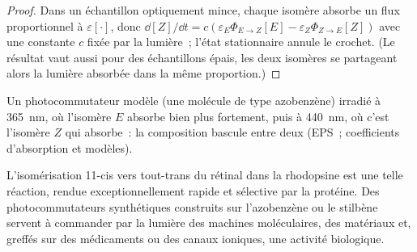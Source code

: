 \begin{proof}
Dans un échantillon optiquement mince, chaque isomère absorbe un flux
proportionnel à $\varepsilon[\cdot]$, donc
$\dd[Z]/\dd t = c(\varepsilon_E\Phi_{E\to Z}[E] - \varepsilon_Z\Phi_{Z\to E}[Z])$
avec une constante $c$ fixée par la lumière~;
l'état stationnaire annule le crochet. (Le résultat vaut aussi pour des
échantillons épais, les deux isomères se partageant alors la lumière
absorbée dans la même proportion.)
\end{proof}

\begin{omfigure}

{\small Un photocommutateur modèle (une molécule de type azobenzène)
irradié à \qty{365}{nm}, où l'isomère $E$ absorbe bien plus fortement,
puis à \qty{440}{nm}, où c'est l'isomère $Z$ qui absorbe~: la
composition bascule entre deux  (EPS~;
coefficients d'absorption et  modèles).}
\end{omfigure}

L'isomérisation 11-cis vers tout-trans du rétinal dans la rhodopsine est
une telle réaction, rendue exceptionnellement rapide et sélective par la
protéine. Des photocommutateurs synthétiques construits sur l'azobenzène
ou le stilbène servent à commander par la lumière des machines
moléculaires, des matériaux et, greffés sur des médicaments ou des
canaux ioniques, une activité biologique.

